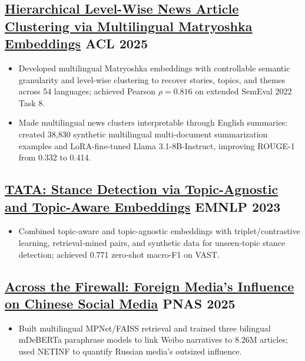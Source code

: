 \documentclass[a4,10pt]{article}
\newenvironment{zitemize}{
  \begin{itemize}\itemsep0pt\parskip0pt\parsep1pt}
  {\end{itemize}\vspace{-0.4cm}}
\begin{document}
\vspace{0.25em}
\subsection*{\href{https://aclanthology.org/2025.acl-long.124/}{Hierarchical Level-Wise News Article Clustering via Multilingual Matryoshka Embeddings} \hfill ACL 2025}
\begin{zitemize}
\item Developed multilingual Matryoshka embeddings with controllable semantic granularity and level-wise clustering to recover stories, topics, and themes across 54 languages; achieved Pearson $\rho=0.816$ on extended SemEval 2022 Task 8.
\item Made multilingual news clusters interpretable through English summaries: created 38,830 synthetic multilingual multi-document summarization examples and LoRA-fine-tuned Llama 3.1-8B-Instruct, improving ROUGE-1 from 0.332 to 0.414.
\end{zitemize}

\vspace{0.25em}
\subsection*{\href{https://aclanthology.org/2023.emnlp-main.694/}{TATA: Stance Detection via Topic-Agnostic and Topic-Aware Embeddings} \hfill EMNLP 2023}
\begin{zitemize}
\item Combined topic-aware and topic-agnostic embeddings with triplet/contrastive learning, retrieval-mined pairs, and synthetic data for unseen-topic stance detection; achieved 0.771 zero-shot macro-F1 on VAST.
\end{zitemize}

\vspace{0.25em}
\subsection*{\href{https://www.pnas.org/doi/10.1073/pnas.2420607122}{Across the Firewall: Foreign Media’s Influence on Chinese Social Media} \hfill PNAS 2025}
\begin{zitemize}
\item Built multilingual MPNet/FAISS retrieval and trained three bilingual mDeBERTa paraphrase models to link Weibo narratives to 8.26M articles; used NETINF to quantify Russian media's outsized influence.
\end{zitemize}
\end{document}
